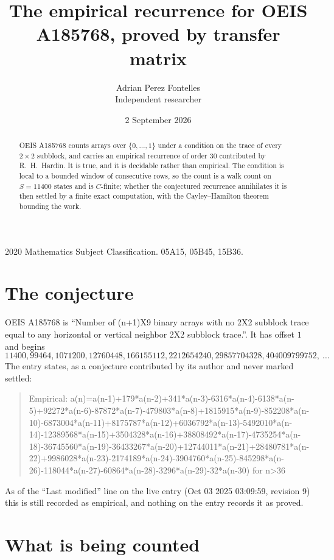 \documentclass[11pt,a4paper]{article}
\title{The empirical recurrence for OEIS A185768, proved by transfer matrix}
\author{Adrian Perez Fontelles\\ \small Independent researcher}
\date{2 September 2026}
\theoremstyle{plain}
\theoremstyle{definition}
\begin{document}
\maketitle

\begin{abstract}
OEIS A185768 counts arrays over $\{0,\dots,1\}$ under a condition on the trace of every
$2\times2$ subblock, and carries an empirical recurrence of order $30$ contributed by
R.~H.~Hardin. It is true, and it is decidable rather than empirical. The condition is local to
a bounded window of consecutive rows, so the count is a walk count on $S=11400$ states and is
$C$-finite; whether the conjectured recurrence annihilates it is then settled by a finite exact
computation, with the Cayley--Hamilton theorem bounding the work.
\end{abstract}

\noindent\small 2020 Mathematics Subject Classification. 05A15, 05B45, 15B36.\normalsize

\section{The conjecture}

OEIS A185768 is ``Number of (n+1)X9 binary arrays with no 2X2 subblock trace equal to any horizontal or vertical neighbor 2X2 subblock trace.''. It has offset $1$ and begins
\[
11400, 99464, 1071200, 12760448, 166155112, 2212654240, 29857704328, 404009799752,\ \dots
\]
The entry states, as a conjecture contributed by its author and never marked settled:
\begin{quote}
Empirical: a(n)=a(n-1)+179*a(n-2)+341*a(n-3)-6316*a(n-4)-6138*a(n-5)+92272*a(n-6)-87872*a(n-7)-479803*a(n-8)+1815915*a(n-9)-852208*a(n-10)-6873004*a(n-11)+8175787*a(n-12)+6036792*a(n-13)-5492010*a(n-14)-12389568*a(n-15)+3504328*a(n-16)+38808492*a(n-17)-4735254*a(n-18)-36745560*a(n-19)-36433267*a(n-20)+12744011*a(n-21)+28480781*a(n-22)+9986028*a(n-23)-2174189*a(n-24)-3904760*a(n-25)-845298*a(n-26)-118044*a(n-27)-60864*a(n-28)-3296*a(n-29)-32*a(n-30) for n>36
\end{quote}
As of the ``Last modified'' line on the live entry (Oct 03 2025 03:09:59, revision 9) this is still
recorded as empirical, and nothing on the entry records it as proved.

\section{What is being counted}
\end{document}
